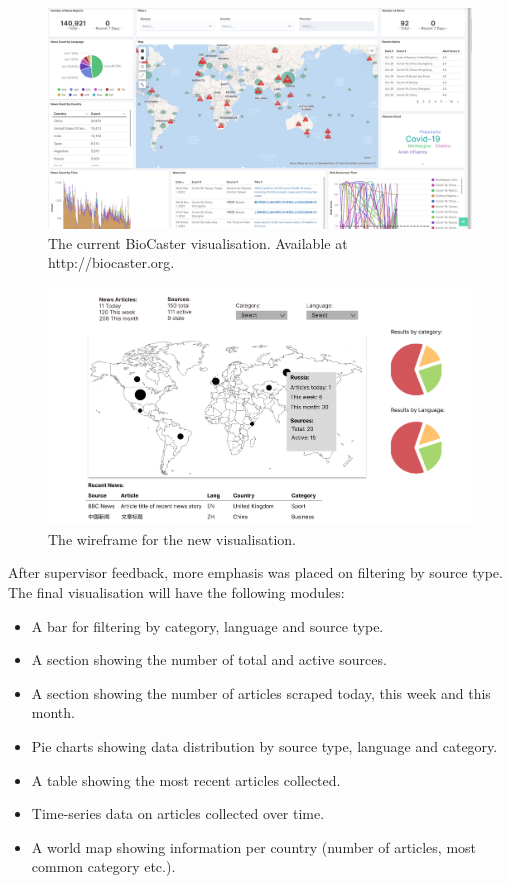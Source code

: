 \documentclass{l4proj}
\begin{document}
 \begin{figure}[h]
\centering
\includegraphics[width=\textwidth]{images/biocaster_interface.png}
\caption{The current BioCaster visualisation. Available at http://biocaster.org.}
\label{fig:biocaster-visualisation}
\end{figure}

 \begin{figure}[h]
\centering
\includegraphics[width=\textwidth]{images/visualisation-wireframe.png}
\caption{The wireframe for the new visualisation.}
\label{fig:visualisation-wireframe}
\end{figure}


After supervisor feedback, more emphasis was placed on filtering by source type. The final visualisation will have the following modules:
\begin{itemize}
    \item A bar for filtering by category, language and source type.
    \item A section showing the number of total and active sources.
    \item A section showing the number of articles scraped today, this week and this month.
    \item Pie charts showing data distribution by source type, language and category.
    \item A table showing the most recent articles collected.
    \item Time-series data on articles collected over time.
    \item A world map showing information per country (number of articles, most common category etc.).
\end{itemize}
\end{document}
